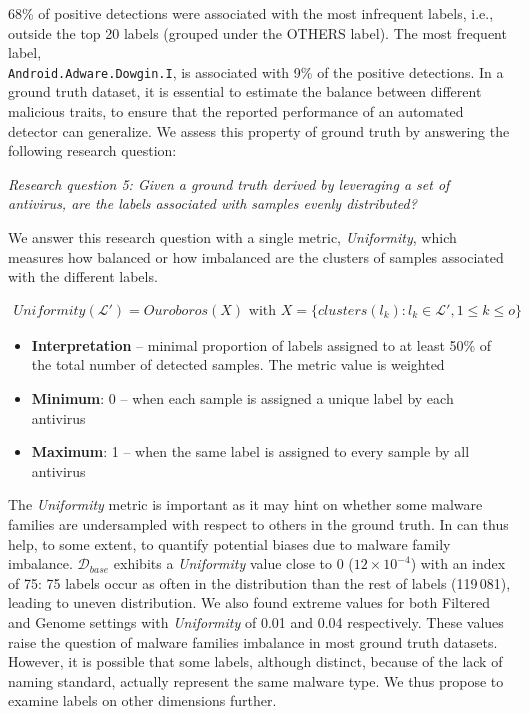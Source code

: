 68\% of positive detections were associated with the most infrequent labels, i.e., outside the top 20 labels (grouped under the OTHERS label).
The most frequent label, \\ \texttt{Android.Adware.Dowgin.I}, is associated with 9\% of the positive detections.
In a ground truth dataset, it is essential to estimate the balance between different malicious traits, to ensure that the reported performance of an automated detector can generalize.
We assess this property of ground truth by answering the following research question:

\begin{mdframed}[roundcorner=10pt,nobreak]
	{\em Research question 5: Given a ground truth derived by leveraging a set of antivirus, are the labels associated with samples evenly distributed?}
\end{mdframed}

We answer this research question with a single metric, \emph{Uniformity}, which measures how balanced or how imbalanced are the clusters of samples associated with the different labels.

\begin{mdframed}[hidealllines=true,nobreak=true]
\begin{gather*}
	Uniformity(\mathcal{L'}) = Ouroboros(X) \text{ with }
	X = \{clusters(l_k) : l_k \in \mathcal{L'}, 1 \leq k \leq o\}
\end{gather*}

\begin{itemize}
	\item{\textbf{Interpretation}} -- minimal proportion of labels assigned to at least 50\% of the total number of detected samples. The metric value is weighted
	\item{\textbf{Minimum}}: 0 -- when each sample is assigned a unique label by each antivirus
	\item{\textbf{Maximum}}: 1 -- when the same label is assigned to every sample by all antivirus
\end{itemize}
\end{mdframed}

The \emph{Uniformity} metric is important as it may hint on whether some malware families are undersampled with respect to others in the ground truth.
In can thus help, to some extent, to quantify potential biases due to malware family imbalance.
$\mathcal{D}_{base}$ exhibits a \emph{Uniformity} value close to 0 ($12\times10^{-4}$) with an index of 75: 75 labels occur as often in the distribution than the rest of labels (119\,081), leading to uneven distribution.
We also found extreme values for both Filtered and Genome settings with \emph{Uniformity} of 0.01 and 0.04 respectively.
These values raise the question of malware families imbalance in most ground truth datasets.
However, it is possible that some labels, although distinct, because of the lack of naming standard, actually represent the same malware type.
We thus propose to examine labels on other dimensions further.
